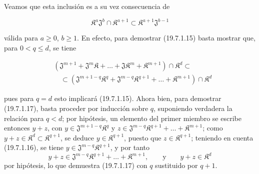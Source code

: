 Veamos que esta inclusión es a su vez consecuencia de
\begin{env}[19.7.1.16]
\label{IV.19.7.1.16}
\[
  \mathfrak K^a\mathfrak J^b\cap\mathfrak K^{a+1}\subset\mathfrak K^{a+1}\mathfrak J^{b-1}
\]
\end{env}
válida para $a\geq0$, $b\geq1$. En efecto, para demostrar (19.7.1.15) basta mostrar que, para $0<q\leq d$, se tiene
\begin{env}[19.7.1.17]
\label{IV.19.7.1.17}
\[
\begin{aligned}
  &(\mathfrak J^{m+1}+\mathfrak J^m\mathfrak K+\ldots+\mathfrak J\mathfrak K^m+\mathfrak K^{m+1})\cap\mathfrak K^d\subset\\
  &\quad\subset(\mathfrak J^{m+1-q}\mathfrak K^q+\mathfrak J^{m-q}\mathfrak K^{q+1}+\ldots+\mathfrak K^{m+1})\cap\mathfrak K^d
\end{aligned}
\]
\end{env}
pues para $q=d$ esto implicará (19.7.1.15). Ahora bien, para demostrar (19.7.1.17), basta proceder por inducción sobre $q$, suponiendo verdadera la relación para $q<d$; por hipótesis, un elemento del primer miembro se escribe entonces $y+z$, con $y\in\mathfrak J^{m+1-q}\mathfrak K^q$ y $z\in\mathfrak J^{m-q}\mathfrak K^{q+1}+\ldots+\mathfrak K^{m+1}$; como $y+z\in\mathfrak K^d\subset\mathfrak K^{q+1}$, se deduce $y\in\mathfrak K^{q+1}$, puesto que $z\in\mathfrak K^{q+1}$; teniendo en cuenta (19.7.1.16), se tiene $y\in\mathfrak J^{m-q}\mathfrak K^{q+1}$, y por tanto
\[
  y+z\in\mathfrak J^{m-q}\mathfrak K^{q+1}+\ldots+\mathfrak K^{m+1},\qquad\text{y}\qquad y+z\in\mathfrak K^d
\]
por hipótesis, lo que demuestra (19.7.1.17) con $q$ sustituido por $q+1$.


